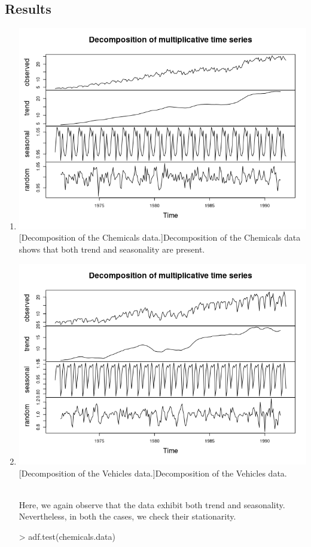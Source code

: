 \subsection{Results}
\begin{enumerate}[label=(\roman*)]
    \item \begin{minipage}[!h]{0.9\linewidth}
    \includegraphics[width=\linewidth]{Images/P3/Chemicals_Plot.png}
    [Decomposition of the Chemicals data.]{Decomposition of the Chemicals data shows that both trend and seasonality are present.}
    \end{minipage}
    
    \item \begin{minipage}[!h]{0.9\linewidth}
    \includegraphics[width=\linewidth]{Images/P3/Vehicles_Plot.png}
    [Decomposition of the Vehicles data.]{Decomposition of the Vehicles data.}
    \end{minipage} \\
    Here, we again observe that the data exhibit both trend and seasonality. Nevertheless, in both the cases, we check their stationarity.
    \small\begin{block}
> adf.test(chemicals.data)


\end{block}
\end{enumerate}
